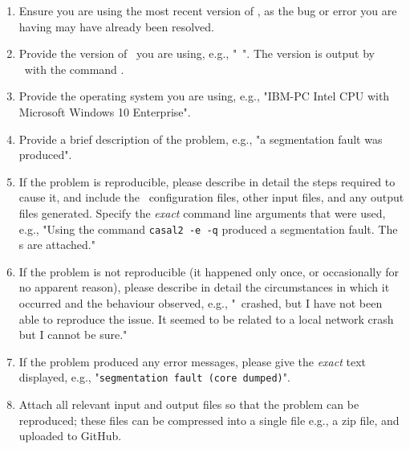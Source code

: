 \begin{enumerate}

\item Ensure you are using the most recent version of \CNAME, as the bug or error you are having may have already been resolved. 

\item Provide the version of \CNAME\ you are using, e.g., "\CNAME\ \VER". The version is output by \CNAME\ with the command .

\item Provide the operating system you are using, e.g., "IBM-PC Intel CPU with Microsoft Windows 10 Enterprise".

\item Provide a brief description of the problem, e.g., "a segmentation fault was produced".

\item If the problem is reproducible, please describe in detail the steps required to cause it, and include the \CNAME\ configuration files, other input files, and any output files generated. Specify the \emph{exact} command line arguments that were used, e.g., "Using the command \texttt{casal2 -e -q} produced a segmentation fault. The \config s are attached."

\item If the problem is not reproducible (it happened only once, or occasionally for no apparent reason), please describe in detail the circumstances in which it occurred and the behaviour observed, e.g., "\CNAME\ crashed, but I have not been able to reproduce the issue. It seemed to be related to a local network crash but I cannot be sure."

\item If the problem produced any error messages, please give the \emph{exact} text displayed, e.g., "\texttt{segmentation fault (core dumped)}".

\item Attach all relevant input and output files so that the problem can be reproduced; these files can be compressed into a single file e.g., a zip file, and uploaded to GitHub.

\end{enumerate}
